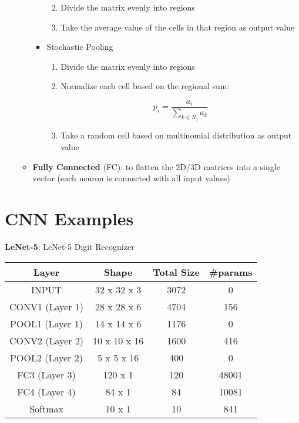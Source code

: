 \documentclass[
]{book}
\providecommand{\tightlist}{%
  \setlength{\itemsep}{0pt}\setlength{\parskip}{0pt}}
\begin{document}
\begin{itemize}
\begin{itemize}
\begin{itemize}
      \begin{enumerate}
      \def\labelenumi{\arabic{enumi}.}
      \tightlist
      \item
        Divide the matrix evenly into regions
      \item
        Take the average value of the cells in that region as output
        value\\
      \end{enumerate}
    \item
      Stochastic Pooling

      \begin{enumerate}
      \def\labelenumi{\arabic{enumi}.}
      \item
        Divide the matrix evenly into regions
      \item
        Normalize each cell based on the regional sum:

        \[\begin{equation}
         p_i=\frac{a_i}{\sum_{k\in R_j}{a_k}}
         \end{equation}\]
      \item
        Take a random cell based on multinomial distribution as output
        value\\
      \end{enumerate}
    \end{itemize}
  \item
    \textbf{Fully Connected} (FC): to flatten the 2D/3D matrices into a
    single vector (each neuron is connected with all input values)
  \end{itemize}
\end{itemize}

\hypertarget{cnn-examples}{%
\section{CNN Examples}\label{cnn-examples}}

\textbf{LeNet-5}: LeNet-5 Digit Recognizer

\begin{longtable}[]{@{}cccc@{}}
\toprule
Layer & Shape & Total Size & \#params\tabularnewline
\midrule
\endhead
INPUT & 32 x 32 x 3 & 3072 & 0\tabularnewline
CONV1 (Layer 1) & 28 x 28 x 6 & 4704 & 156\tabularnewline
POOL1 (Layer 1) & 14 x 14 x 6 & 1176 & 0\tabularnewline
CONV2 (Layer 2) & 10 x 10 x 16 & 1600 & 416\tabularnewline
POOL2 (Layer 2) & 5 x 5 x 16 & 400 & 0\tabularnewline
FC3 (Layer 3) & 120 x 1 & 120 & 48001\tabularnewline
FC4 (Layer 4) & 84 x 1 & 84 & 10081\tabularnewline
Softmax & 10 x 1 & 10 & 841\tabularnewline
\bottomrule
\end{longtable}
\end{document}
